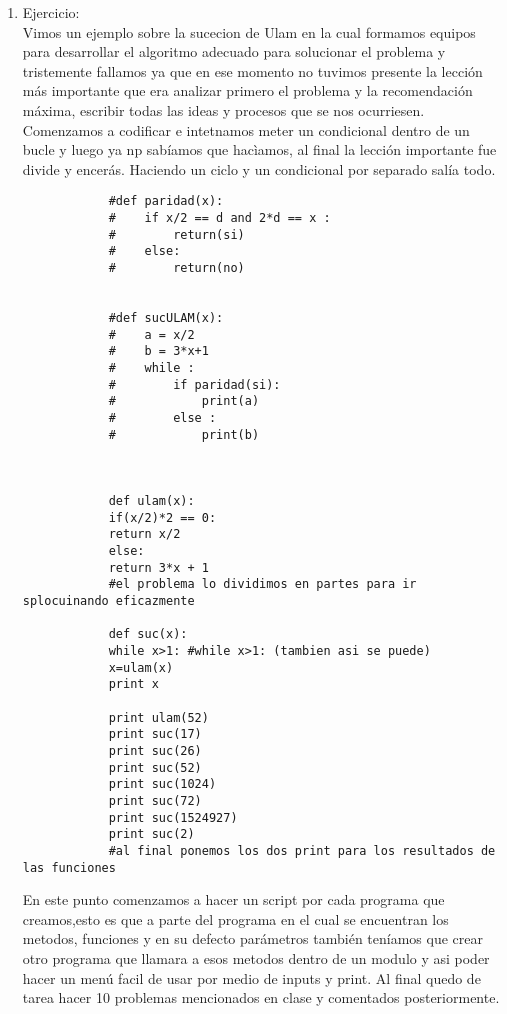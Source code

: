 \documentclass[letterpaper, 12pt, oneside]{article}
\begin{document}
\begin{enumerate}
\begin{enumerate}
			\item Ejercicio:\\
			Vimos un ejemplo sobre la sucecion de Ulam en la cual formamos equipos para desarrollar el algoritmo adecuado para solucionar el problema y tristemente fallamos ya que en ese momento no tuvimos presente la lección más importante que era analizar primero el problema y la recomendación máxima, escribir todas las ideas y procesos que se nos ocurriesen. Comenzamos a codificar e intetnamos meter un condicional dentro de un bucle y luego ya np sabíamos que hacìamos, al final la lección importante fue divide y encerás. Haciendo un ciclo y un condicional por separado salía todo. \\
			
			\newpage
			\begin{verbatim}
			#def paridad(x):
			#    if x/2 == d and 2*d == x :
			#        return(si)
			#    else:
			#        return(no)
			
			
			#def sucULAM(x):
			#    a = x/2
			#    b = 3*x+1
			#    while :
			#        if paridad(si):
			#            print(a)
			#        else :
			#            print(b)
			
			
			
			def ulam(x):
			if(x/2)*2 == 0: 
			return x/2
			else:
			return 3*x + 1
			#el problema lo dividimos en partes para ir splocuinando eficazmente
			
			def suc(x):
			while x>1: #while x>1: (tambien asi se puede)
			x=ulam(x)
			print x
			
			print ulam(52)
			print suc(17)
			print suc(26)
			print suc(52)
			print suc(1024)
			print suc(72)
			print suc(1524927)
			print suc(2)
			#al final ponemos los dos print para los resultados de las funciones
			\end{verbatim}
			\newpage
			En este punto comenzamos a hacer un script por cada programa que creamos,esto es que a parte del programa en el cual se encuentran los metodos, funciones y en su defecto parámetros también teníamos que crear otro programa que llamara a esos metodos dentro de un modulo y asi poder hacer un menú facil de usar por medio de inputs y print. Al final quedo de tarea hacer 10 problemas mencionados en clase y comentados posteriormente. 
		\end{enumerate}
	\end{enumerate}
\end{document}
